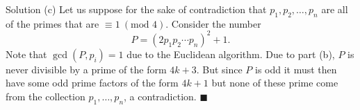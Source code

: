 \documentclass{article}
\begin{document}
\begin{solution}{Solution}
(c) Let us suppose for the sake of contradiction that $p_1, p_2, \ldots,
p_n$ are all of the primes that are $\equiv 1 \ (\text{mod } 4)$.
Consider the number
$$
P = (2p_1 p_2 \cdots p_n)^2 + 1.
$$
Note that $\gcd(P, p_i) = 1$ due to the Euclidean algorithm.
Due to part (b), $P$ is never divisible by a prime of the form $4k+3$.
But since $P$ is odd it must then have some odd prime factors of the form
$4k+1$ but none of these prime come from the collection $p_1, \ldots, p_n$,
a contradiction. $\blacksquare$
\end{solution}
\end{document}
